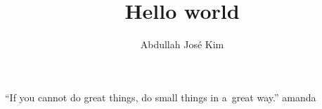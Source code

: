 \documentclass{gescons}
\title {Hello world}
\author{Abdullah José Kim}
\begin{document}
    \maketitle


    \begin{multicols}{3}
        \begin{lead}
            \lipsum[1]
        \end{lead}

        \lipsum[2-3]
        
        \begin{pullquote}
            ``If you cannot do great things, do small things in a~great way.'' amanda
        \end{pullquote}
        
        \lipsum[4]
        
    \end{multicols}
\end{document}
